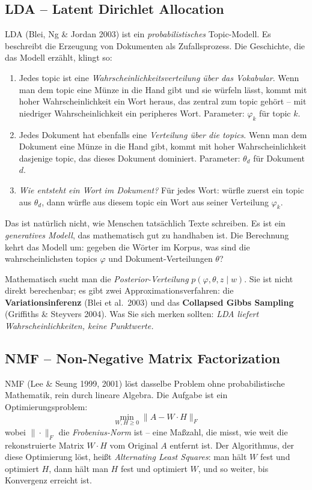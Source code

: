 \documentclass[a4paper,11pt]{article}
\begin{document}
\subsection{LDA -- Latent Dirichlet Allocation}

LDA (Blei, Ng \& Jordan 2003) ist ein \emph{probabilistisches}
Topic-Modell. Es beschreibt die Erzeugung von Dokumenten als
Zufallsprozess. Die Geschichte, die das Modell erzählt, klingt so:

\begin{enumerate}
\item Jedes topic ist eine \emph{Wahrscheinlichkeitsverteilung über
das Vokabular}. Wenn man dem topic eine Münze in die Hand gibt und
sie würfeln lässt, kommt mit hoher Wahrscheinlichkeit ein Wort heraus,
das zentral zum topic gehört -- mit niedriger Wahrscheinlichkeit ein
peripheres Wort. Parameter: $\varphi_k$ für topic $k$.

\item Jedes Dokument hat ebenfalls eine \emph{Verteilung über die
topics}. Wenn man dem Dokument eine Münze in die Hand gibt, kommt
mit hoher Wahrscheinlichkeit dasjenige topic, das dieses Dokument
dominiert. Parameter: $\theta_d$ für Dokument $d$.

\item \emph{Wie entsteht ein Wort im Dokument?} Für jedes Wort:
würfle zuerst ein topic aus $\theta_d$, dann würfle aus diesem topic
ein Wort aus seiner Verteilung $\varphi_k$.
\end{enumerate}

Das ist natürlich nicht, wie Menschen tatsächlich Texte schreiben.
Es ist ein \emph{generatives Modell}, das mathematisch gut zu
handhaben ist. Die Berechnung kehrt das Modell um: gegeben die Wörter
im Korpus, was sind die wahrscheinlichsten topics $\varphi$ und
Dokument-Verteilungen $\theta$?

Mathematisch sucht man die \emph{Posterior-Verteilung}
$p(\varphi, \theta, z \mid w)$. Sie ist nicht direkt berechenbar; es
gibt zwei Approximationsverfahren: die \textbf{Variationsinferenz}
(Blei et al.\ 2003) und das \textbf{Collapsed Gibbs Sampling}
(Griffiths \& Steyvers 2004). Was Sie sich merken sollten:
\emph{LDA liefert Wahrscheinlichkeiten, keine Punktwerte.}

\subsection{NMF -- Non-Negative Matrix Factorization}

NMF (Lee \& Seung 1999, 2001) löst dasselbe Problem ohne probabilistische
Mathematik, rein durch lineare Algebra. Die Aufgabe ist ein
Optimierungsproblem:
\[
\min_{W, H \geq 0} \| A - W \cdot H \|_F
\]
wobei $\| \cdot \|_F$ die \emph{Frobenius-Norm} ist -- eine Maßzahl,
die misst, wie weit die rekonstruierte Matrix $W \cdot H$ vom
Original $A$ entfernt ist. Der Algorithmus, der diese Optimierung
löst, heißt \emph{Alternating Least Squares}: man hält $W$ fest und
optimiert $H$, dann hält man $H$ fest und optimiert $W$, und so weiter,
bis Konvergenz erreicht ist.
\end{document}
